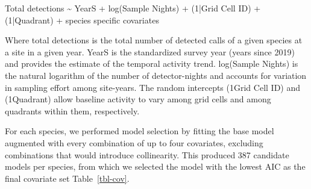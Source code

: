 \documentclass[
  letterpaper,
  DIV=11,
  numbers=noendperiod]{scrartcl}
\newenvironment{Shaded}{\begin{snugshade}}{\end{snugshade}}
\newcommand{\DecValTok}[1]{\textcolor[rgb]{0.68,0.00,0.00}{#1}}
\newcommand{\FunctionTok}[1]{\textcolor[rgb]{0.28,0.35,0.67}{#1}}
\newcommand{\NormalTok}[1]{\textcolor[rgb]{0.00,0.23,0.31}{#1}}
\newcommand{\SpecialCharTok}[1]{\textcolor[rgb]{0.37,0.37,0.37}{#1}}
\begin{document}
\begin{Shaded}
\begin{Highlighting}[]
\NormalTok{Total detections }\SpecialCharTok{\textasciitilde{}}\NormalTok{ YearS }\SpecialCharTok{+} \FunctionTok{log}\NormalTok{(Sample Nights) }\SpecialCharTok{+}\NormalTok{ (}\DecValTok{1}\SpecialCharTok{|}\NormalTok{Grid Cell ID) }\SpecialCharTok{+}\NormalTok{ (}\DecValTok{1}\SpecialCharTok{|}\NormalTok{Quadrant) }
\SpecialCharTok{+}\NormalTok{ species specific covariates}
\end{Highlighting}
\end{Shaded}

Where total detections is the total number of detected calls of a given
species at a site in a given year. YearS is the standardized survey year
(years since 2019) and provides the estimate of the temporal activity
trend. log(Sample Nights) is the natural logarithm of the number of
detector-nights and accounts for variation in sampling effort among
site-years. The random intercepts (1\textbar Grid Cell ID) and
(1\textbar Quadrant) allow baseline activity to vary among grid cells
and among quadrants within them, respectively.

For each species, we performed model selection by fitting the base model
augmented with every combination of up to four covariates, excluding
combinations that would introduce collinearity. This produced 387
candidate models per species, from which we selected the model with the
lowest AIC as the final covariate set Table~\ref{tbl-cov}.
\end{document}

